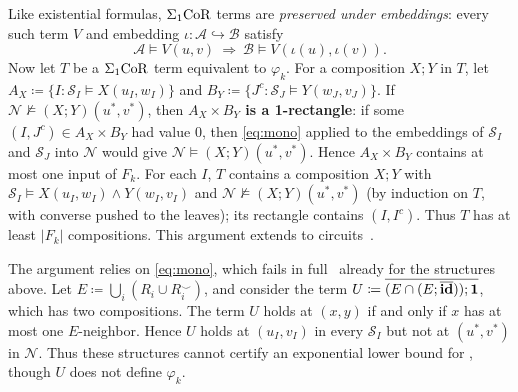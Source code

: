 Like existential formulas, $\Sigma_1\mathrm{CoR}$ terms are \emph{preserved under
embeddings}:
every such term $V$ and embedding
$\iota\colon\mathcal A\hookrightarrow\mathcal B$ satisfy
\[
\tag{$\diamond$}\label{eq:mono}
\mathcal A\models V(u,v)\ \Longrightarrow\
\mathcal B\models V(\iota(u),\iota(v)).
\]
Now let $T$ be a $\Sigma_1\mathrm{CoR}$ term equivalent to $\varphi_k$.
For a composition $X;Y$ in $T$, let
$A_X\coloneqq\{I:\mathcal S_I\models X(u_I,w_I)\}$ and
$B_Y\coloneqq\{J^c:\mathcal S_J\models Y(w_J,v_J)\}$.
If $\mathcal N\not\models(X;Y)(u^*,v^*)$, then \textbf{$A_X\times B_Y$ is a 1\nobreakdash-rectangle}:
if some $(I,J^c)\in A_X\times B_Y$ had value $0$, then \eqref{eq:mono} applied to
the embeddings of $\mathcal S_I$ and $\mathcal S_J$ into $\mathcal N$ would give
$\mathcal N\models(X;Y)(u^*,v^*)$.
Hence $A_X\times B_Y$ contains at most one input of $F_k$.
For each $I$, $T$ contains a composition $X;Y$ with
$\mathcal S_I\models X(u_I,w_I)\land Y(w_I,v_I)$ and
$\mathcal N\not\models(X;Y)(u^*,v^*)$ (by induction on $T$, with converse pushed to the leaves); its rectangle
contains $(I,I^c)$. Thus $T$ has at least $|F_k|$ compositions.
This argument extends to circuits~\citep[\S6.3]{nakamura2022}.

\smallskip
{}
The argument relies on \eqref{eq:mono}, which fails in full \CoR\ already for the structures above.
Let $E\coloneqq\bigcup_i(R_i\cup R_i^\smile)$, and consider the term
$U\coloneqq\overline{(E\cap(E;\overline{\mathbf{id}}));\mathbf{1}}$, which has two compositions. The term $U$ holds at $(x,y)$ if and only if
$x$ has at most one $E$-neighbor. Hence $U$ holds at $(u_I,v_I)$ in every
$\mathcal S_I$ but not at $(u^*,v^*)$ in $\mathcal N$.
Thus these structures cannot certify an exponential lower bound for
\CoR, though $U$ does not define $\varphi_k$.
